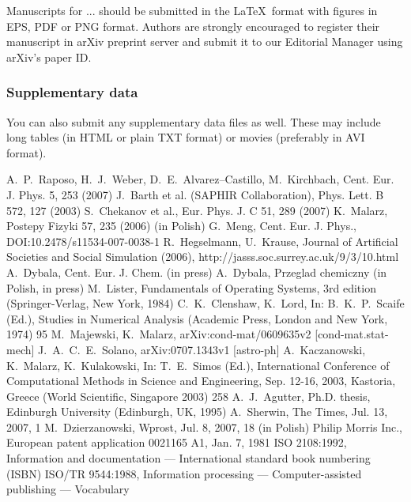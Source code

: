 \documentclass[USenglish,oneside,twocolumn]{article}
\begin{document}
Manuscripts for ... should be submitted in the \LaTeX ~format with figures in EPS, PDF or PNG format. Authors are strongly encouraged to register their manuscript in arXiv preprint server and submit it to our Editorial Manager using arXiv's paper ID.

\subsubsection{Supplementary data}

You can also submit any supplementary data files as well. These may include long tables (in HTML or plain TXT format) or movies (preferably in AVI format).

\begin{thebibliography}{99}
 A.~P.~Raposo, H.~J.~Weber, D.~E.~Alvarez--Castillo, M.~Kirchbach, Cent. Eur. J. Phys. 5, 253 (2007)
 J.~Barth et al. (SAPHIR Collaboration), Phys. Lett. B 572, 127 (2003)
 S.~Chekanov et al., Eur. Phys. J. C 51, 289 (2007)
 K.~Malarz, Postepy Fizyki 57, 235 (2006) (in Polish)
 G.~Meng, Cent. Eur. J. Phys., DOI:10.2478/s11534-007-0038-1
 R.~Hegselmann, U.~Krause, Journal of Artificial Societies and Social Simulation (2006), http://jasss.soc.surrey.ac.uk/9/3/10.html
 A.~Dybala, Cent. Eur. J. Chem. (in press)
 A.~Dybala, Przeglad chemiczny (in Polish, in press)
 M.~Lister, Fundamentals of Operating Systems, 3rd edition (Springer-Verlag, New York, 1984)
 C.~K.~Clenshaw, K.~Lord, In: B.~K.~P.~Scaife (Ed.), Studies in Numerical Analysis (Academic Press, London and New York, 1974) 95
 M.~Majewski, K.~Malarz, arXiv:cond-mat/0609635v2 [cond-mat.stat-mech]
 J.~A.~C.~E.~Solano, arXiv:0707.1343v1 [astro-ph]
 A.~Kaczanowski, K.~Malarz, K.~Kulakowski, In: T.~E.~Simos (Ed.), International Conference of Computational Methods in Science and Engineering, Sep. 12-16, 2003, Kastoria, Greece (World Scientific, Singapore 2003) 258
 A.~J.~Agutter, Ph.D. thesis, Edinburgh University (Edinburgh, UK, 1995)
 A.~Sherwin, The Times, Jul. 13, 2007, 1
 M.~Dzierzanowski, Wprost, Jul. 8, 2007, 18 (in Polish)
 Philip Morris Inc., European patent application 0021165 A1, Jan. 7, 1981
 ISO 2108:1992, Information and documentation --- International standard book numbering (ISBN)
 ISO/TR 9544:1988, Information processing --- Computer-assisted publishing --- Vocabulary
\end{thebibliography}
\end{document}
